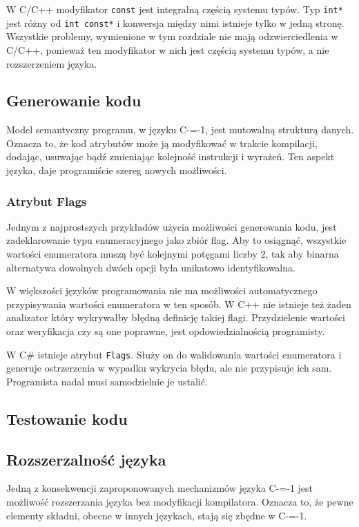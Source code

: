 W C/C++ modyfikator \lstinline{const} jest integralną częścią systemu typów.
Typ \lstinline{int*} jest różny od \lstinline{int const*} i konwersja między nimi istnieje tylko w jedną stronę.
Wszystkie problemy, wymienione w tym rozdziale nie mają odzwierciedlenia w C/C++, ponieważ ten modyfikator w nich jest częścią systemu typów, a nie rozszerzeniem języka.

\subsection{Generowanie kodu}

Model semantyczny programu, w języku C-=-1, jest mutowalną strukturą danych.
Oznacza to, że kod atrybutów może ją modyfikować w trakcie kompilacji, dodając, usuwając bądź zmieniając kolejność instrukcji i wyrażeń.
Ten aspekt języka, daje programiście szereg nowych możliwości.

\subsubsection{Atrybut Flags}

Jednym z najprostszych przykładów użycia możliwości generowania kodu, jest zadeklarowanie typu enumeracyjnego jako zbiór flag.
Aby to osiągnąć, wszystkie wartości enumeratora muszą być kolejnymi potęgami liczby 2, tak aby binarna alternatywa dowolnych dwóch opcji była unikatowo identyfikowalna.%

W większości języków programowania nie ma możliwości automatycznego przypisywania wartości enumeratora w ten sposób.
W C++ nie istnieje też żaden analizator który wykrywałby błędną definicję takiej flagi.
Przydzielenie wartości oraz weryfikacja czy są one poprawne, jest opdowiedzialnością programisty.

W C\# istnieje atrybut \lstinline{Flags}.
Służy on do walidowania wartości enumeratora i generuje ostrzerzenia w wypadku wykrycia błędu, ale nie przypisuje ich sam.
Programista nadal musi samodzielnie je ustalić.


\subsection{Testowanie kodu}

\subsection{Rozszerzalność języka}
\label{Language_extensibility}
Jedną z konsekwencji zaproponowanych mechanizmów języka C-=-1 jest możliwość rozszerzania języka bez modyfikacji kompilatora.
Oznacza to, że pewne elementy składni, obecne w innych językach, stają się zbędne w C-=-1.
